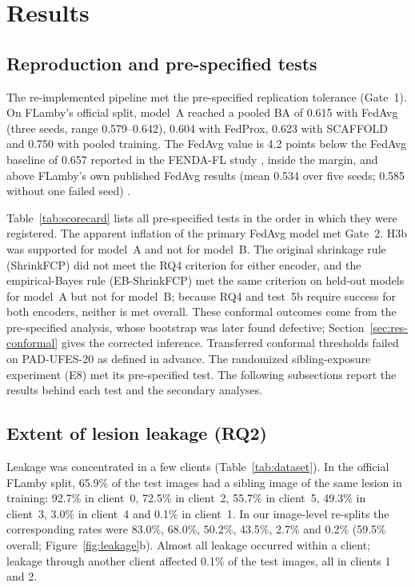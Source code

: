 \section{Results}
\label{sec:results}

\subsection{Reproduction and pre-specified tests}
\label{sec:res-tests}

The re-implemented pipeline met the pre-specified replication tolerance (Gate~1). On FLamby's official
split, model~A reached a pooled BA of 0.615 with FedAvg (three seeds, range 0.579--0.642), 0.604 with
FedProx, 0.623 with SCAFFOLD and 0.750 with pooled training. The FedAvg value is 4.2 points below the
FedAvg baseline of 0.657 reported in the FENDA-FL study \cite{tavakoli2024fendafl}, inside the margin,
and above FLamby's own published FedAvg results (mean 0.534 over five seeds; 0.585 without one failed
seed) \cite{flamby2022}.

Table~\ref{tab:scorecard} lists all pre-specified tests in the order in which they were registered. The
apparent inflation of the primary FedAvg model met Gate~2. H3b was supported for model~A and not for
model~B. The original shrinkage rule (ShrinkFCP) did not meet the RQ4 criterion for either encoder, and
the empirical-Bayes rule (EB-ShrinkFCP) met the same criterion on held-out models for model~A but not for
model~B; because RQ4 and test~5b require success for both encoders, neither is met overall. These conformal outcomes come from the pre-specified analysis, whose bootstrap was later found defective; Section~\ref{sec:res-conformal} gives the corrected inference. Transferred
conformal thresholds failed on PAD-UFES-20 as defined in advance. The randomized sibling-exposure experiment (E8) met its pre-specified test. The following subsections
report the results behind each test and the secondary analyses.


\subsection{Extent of lesion leakage (RQ2)}
\label{sec:res-extent}

Leakage was concentrated in a few clients (Table~\ref{tab:dataset}). In the official FLamby split, 65.9\%
of the test images had a sibling image of the same lesion in training: 92.7\% in client~0, 72.5\% in
client~2, 55.7\% in client~5, 49.3\% in client~3, 3.0\% in client~4 and 0.1\% in client~1. In our
image-level re-splits the corresponding rates were 83.0\%, 68.0\%, 50.2\%, 43.5\%, 2.7\% and 0.2\%
(59.5\% overall; Figure~\ref{fig:leakage}b). Almost all leakage occurred within a client; leakage through
another client affected 0.1\% of the test images, all in clients 1 and 2.

